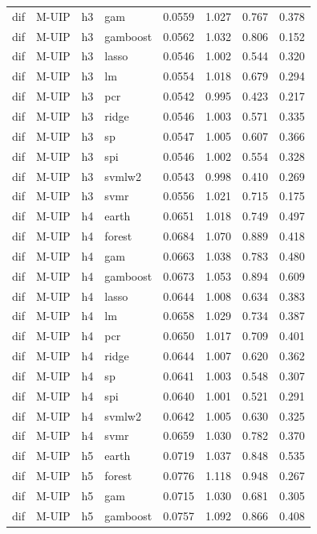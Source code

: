 \begin{ThreePartTable}
\begin{longtable}[t]{llclcccc}
dif & M-UIP & h3 & gam & 0.0559 & 1.027 & 0.767 & 0.378\\
dif & M-UIP & h3 & gamboost & 0.0562 & 1.032 & 0.806 & 0.152\\
dif & M-UIP & h3 & lasso & 0.0546 & 1.002 & 0.544 & 0.320\\
dif & M-UIP & h3 & lm & 0.0554 & 1.018 & 0.679 & 0.294\\
dif & M-UIP & h3 & pcr & 0.0542 & 0.995 & 0.423 & 0.217\\
dif & M-UIP & h3 & ridge & 0.0546 & 1.003 & 0.571 & 0.335\\
dif & M-UIP & h3 & sp & 0.0547 & 1.005 & 0.607 & 0.366\\
dif & M-UIP & h3 & spi & 0.0546 & 1.002 & 0.554 & 0.328\\
dif & M-UIP & h3 & svmlw2 & 0.0543 & 0.998 & 0.410 & 0.269\\
dif & M-UIP & h3 & svmr & 0.0556 & 1.021 & 0.715 & 0.175\\
\addlinespace
dif & M-UIP & h4 & earth & 0.0651 & 1.018 & 0.749 & 0.497\\
dif & M-UIP & h4 & forest & 0.0684 & 1.070 & 0.889 & 0.418\\
dif & M-UIP & h4 & gam & 0.0663 & 1.038 & 0.783 & 0.480\\
dif & M-UIP & h4 & gamboost & 0.0673 & 1.053 & 0.894 & 0.609\\
dif & M-UIP & h4 & lasso & 0.0644 & 1.008 & 0.634 & 0.383\\
dif & M-UIP & h4 & lm & 0.0658 & 1.029 & 0.734 & 0.387\\
dif & M-UIP & h4 & pcr & 0.0650 & 1.017 & 0.709 & 0.401\\
dif & M-UIP & h4 & ridge & 0.0644 & 1.007 & 0.620 & 0.362\\
dif & M-UIP & h4 & sp & 0.0641 & 1.003 & 0.548 & 0.307\\
dif & M-UIP & h4 & spi & 0.0640 & 1.001 & 0.521 & 0.291\\
dif & M-UIP & h4 & svmlw2 & 0.0642 & 1.005 & 0.630 & 0.325\\
dif & M-UIP & h4 & svmr & 0.0659 & 1.030 & 0.782 & 0.370\\
\addlinespace
dif & M-UIP & h5 & earth & 0.0719 & 1.037 & 0.848 & 0.535\\
dif & M-UIP & h5 & forest & 0.0776 & 1.118 & 0.948 & 0.267\\
dif & M-UIP & h5 & gam & 0.0715 & 1.030 & 0.681 & 0.305\\
dif & M-UIP & h5 & gamboost & 0.0757 & 1.092 & 0.866 & 0.408\\

\end{longtable}
\end{ThreePartTable}
